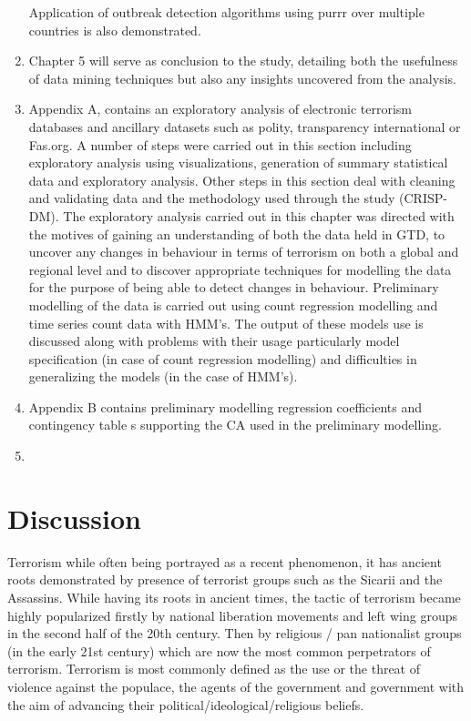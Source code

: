 \begin{enumerate}
Application of outbreak detection algorithms using purrr over multiple countries is also demonstrated.
\item Chapter 5 will serve as conclusion to the study, detailing both the usefulness of data mining techniques but also any insights uncovered from the analysis.
\item Appendix A, contains an exploratory analysis of electronic terrorism databases and ancillary datasets such as polity, transparency international or Fas.org. A number of steps were carried out in this section including exploratory analysis using visualizations, generation of summary statistical data and exploratory analysis. Other steps in this section deal with cleaning and validating data and the methodology used through the study (CRISP-DM). The exploratory analysis carried out in this chapter was directed with the motives of gaining an understanding of both the data held in GTD, to uncover any changes in behaviour in terms of terrorism on both a global and regional level and to discover appropriate techniques for modelling the data for the purpose of being able to detect changes in behaviour. Preliminary modelling of the data is carried out using count regression modelling and time series count data with HMM's. The output of these models use is discussed along with problems with their usage particularly model specification (in case of count regression modelling) and difficulties in generalizing the models (in the case of HMM's).
\item Appendix B contains preliminary modelling regression coefficients and contingency table s supporting the CA used in the preliminary modelling.
\item
\end{enumerate}

\section{Discussion}

Terrorism while often being portrayed as a recent phenomenon, it has ancient roots demonstrated by presence of terrorist groups such as the Sicarii and the Assassins. While having its roots in ancient times, the tactic of terrorism became highly popularized firstly by national liberation movements and left wing groups in the second half of the 20th century. Then by religious / pan nationalist groups (in the early 21st century) which are now the most common perpetrators of terrorism.  Terrorism is most commonly defined as the use or the threat of violence against the populace, the agents of the government and government with the aim of advancing their political/ideological/religious beliefs.

